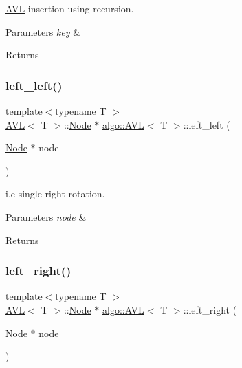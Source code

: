 \hyperlink{classalgo_1_1_a_v_l}{A\+VL} insertion using recursion. 
\begin{DoxyParams}{Parameters}
{\em key} & \\
\hline
\end{DoxyParams}
\begin{DoxyReturn}{Returns}

\end{DoxyReturn}
\mbox{\label{classalgo_1_1_a_v_l_ac913fccd5993b7ba67280bb2f215549a}} 
\subsubsection{\texorpdfstring{left\+\_\+left()}{left\_left()}}
{\footnotesize\ttfamily template$<$typename T $>$ \\
\hyperlink{classalgo_1_1_a_v_l}{A\+VL}$<$ T $>$\+::\hyperlink{structalgo_1_1_a_v_l_1_1_node}{Node} $\ast$ \hyperlink{classalgo_1_1_a_v_l}{algo\+::\+A\+VL}$<$ T $>$\+::left\+\_\+left (\begin{DoxyParamCaption}\item[{\hyperlink{structalgo_1_1_a_v_l_1_1_node}{Node} $\ast$}]{node }\end{DoxyParamCaption})}

i.\+e single right rotation. 
\begin{DoxyParams}{Parameters}
{\em node} & \\
\hline
\end{DoxyParams}
\begin{DoxyReturn}{Returns}

\end{DoxyReturn}
\mbox{\label{classalgo_1_1_a_v_l_a680a6caabc7c13472ac4f6c3f5b30480}} 
\subsubsection{\texorpdfstring{left\+\_\+right()}{left\_right()}}
{\footnotesize\ttfamily template$<$typename T $>$ \\
\hyperlink{classalgo_1_1_a_v_l}{A\+VL}$<$ T $>$\+::\hyperlink{structalgo_1_1_a_v_l_1_1_node}{Node} $\ast$ \hyperlink{classalgo_1_1_a_v_l}{algo\+::\+A\+VL}$<$ T $>$\+::left\+\_\+right (\begin{DoxyParamCaption}\item[{\hyperlink{structalgo_1_1_a_v_l_1_1_node}{Node} $\ast$}]{node }\end{DoxyParamCaption})}


